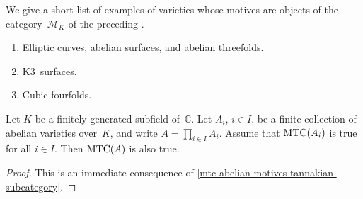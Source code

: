 \documentclass[10pt,twoside,leqno]{article}
\numberwithin{equation}{subsection}
\newcommand{\CC}{\mathbb{C}}
\newcommand{\MTC}{\textnormal{MTC}}
\begin{document}
\begin{remark} %
 We give a short list of examples of varieties whose motives
 are objects of the category~$\mathcal{M}_K$
 of the preceding .
 \begin{enumerate}
  \item Elliptic curves, abelian surfaces, and abelian threefolds.
  \item K3~surfaces.
  \item Cubic fourfolds.
 \end{enumerate}
\end{remark}

\begin{theorem} %
 \label{mtcaxa}
 Let $K$ be a finitely generated subfield of~$\CC$.
 Let $A_i$, $i \in I$, be a finite collection of abelian varieties over~$K$,
	and write $A = \prod_{i \in I} A_i$.
 Assume that $\MTC(A_i)$ is true for all $i \in I$.
 Then $\MTC(A)$ is also true.
 \begin{proof}
  This is an immediate consequence of
  \cref{mtc-abelian-motives-tannakian-subcategory}.
 \end{proof}
\end{theorem}


\printbibliography
\end{document}
